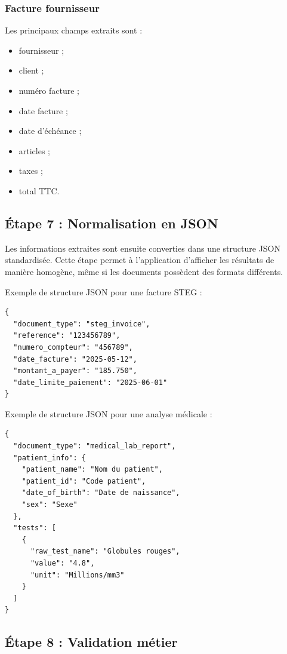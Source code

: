 \subsubsection{Facture fournisseur}

Les principaux champs extraits sont :

\begin{itemize}
\item fournisseur ;
\item client ;
\item numéro facture ;
\item date facture ;
\item date d'échéance ;
\item articles ;
\item taxes ;
\item total TTC.
\end{itemize}

\subsection{Étape 7 : Normalisation en JSON}

Les informations extraites sont ensuite converties dans une structure JSON standardisée. Cette étape permet à l'application d'afficher les résultats de manière homogène, même si les documents possèdent des formats différents.

Exemple de structure JSON pour une facture STEG :

\begin{verbatim}
{
  "document_type": "steg_invoice",
  "reference": "123456789",
  "numero_compteur": "456789",
  "date_facture": "2025-05-12",
  "montant_a_payer": "185.750",
  "date_limite_paiement": "2025-06-01"
}
\end{verbatim}

Exemple de structure JSON pour une analyse médicale :

\begin{verbatim}
{
  "document_type": "medical_lab_report",
  "patient_info": {
    "patient_name": "Nom du patient",
    "patient_id": "Code patient",
    "date_of_birth": "Date de naissance",
    "sex": "Sexe"
  },
  "tests": [
    {
      "raw_test_name": "Globules rouges",
      "value": "4.8",
      "unit": "Millions/mm3"
    }
  ]
}
\end{verbatim}

\subsection{Étape 8 : Validation métier}

